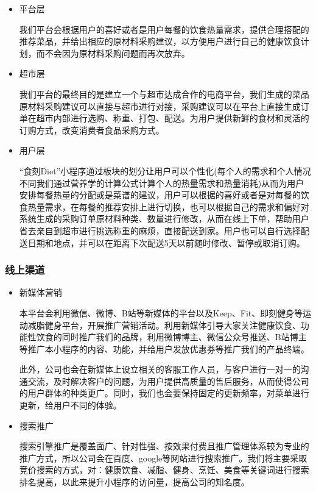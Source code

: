 \documentclass[UTF8,12pt]{ctexart}
\numberwithin{figure}{section}%
\begin{document}
\begin{spacing}{2}
\begin{itemize}
	\item 平台层
	
	我们平台会根据用户的喜好或者是用户每餐的饮食热量需求，提供合理搭配的推荐菜品，并给出相应的原材料采购建议，以方便用户进行自己的健康饮食计划，而不会因为原材料采购问题而再次放弃。
	
	\item 超市层
	
	我们平台的最终目的是建立一个与超市达成合作的电商平台，我们生成的菜品原材料采购建议可以直接与超市进行对接，采购建议可以在平台上直接生成订单在超市内部进行选购、称重、打包、配送。为用户提供新鲜的食材和灵活的订购方式，改变消费者食品采购方式。
	
	\item 用户层 
	
	“食刻Diet”小程序通过板块的划分让用户可以个性化(每个人的需求和个人情况不同我们通过营养学的计算公式计算个人的热量需求和热量消耗)从而为用户安排每餐热量的分配或是菜谱的建议，用户可以根据的喜好或者是对每餐的饮食热量需求，在每餐的推荐安排上进行切换，也可以根据自己的需求和偏好对系统生成的采购订单原材料种类、数量进行修改，从而在线上下单，帮助用户省去亲自到超市进行挑选称重的麻烦，直接配送到家。用户也可以自行选择配送日期和地点，并可以在距离下次配送5天以前随时修改、暂停或取消订购。 
	
\end{itemize}

\subsubsection{线上渠道}
\begin{itemize}
	\item 新媒体营销 
	
	本平台会利用微信、微博、B站等新媒体的平台以及Keep、Fit、即刻健身等运动减脂健身平台，开展推广营销活动。利用新媒体引导大家关注健康饮食、功能性饮食的同时推广我们的品牌，利用微博博主、微信公众号推送、B站博主等推广本小程序的内容、功能，并给用户发放优惠券等推广我们的产品终端。
	
	此外，公司也会在新媒体上设立相关的客服工作人员，与客户进行一对一的沟通交流，及时解决客户的问题，为用户提供高质量的售后服务，从而使得公司的用户群体的种类更广。同时，我们也会要保持固定的更新频率，对菜单进行更新，给用户不同的体验。 
	
	\item 搜索推广 
	
	搜索引擎推广是覆盖面广、针对性强、按效果付费且推广管理体系较为专业的推广方式，所以公司会在百度、google等网站进行搜索推广。我们将主要采取竞价搜索的方式，对：健康饮食、减脂、健身、烹饪、美食等关键词进行搜索排名提高，以此来提升小程序的访问量，提高公司的知名度。 
	

\end{itemize}
\end{spacing}
\end{document}
